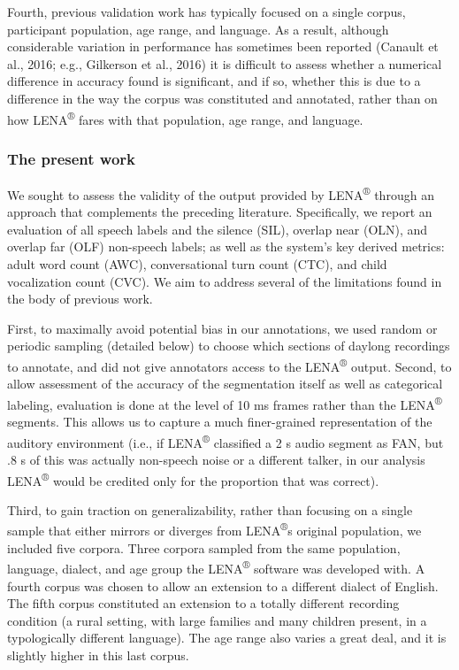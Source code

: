\documentclass[english,floatsintext,man]{apa6}
\begin{document}
Fourth, previous validation work has typically focused on a single
corpus, participant population, age range, and language. As a result,
although considerable variation in performance has sometimes been
reported (Canault et al., 2016; e.g., Gilkerson et al., 2016) it is
difficult to assess whether a numerical difference in accuracy found is
significant, and if so, whether this is due to a difference in the way
the corpus was constituted and annotated, rather than on how
LENA\textsuperscript{®} fares with that population, age range, and
language.

\subsubsection{The present work}\label{the-present-work}

We sought to assess the validity of the output provided by
LENA\textsuperscript{®} through an approach that complements the
preceding literature. Specifically, we report an evaluation of all
speech labels and the silence (SIL), overlap near (OLN), and overlap far
(OLF) non-speech labels; as well as the system's key derived metrics:
adult word count (AWC), conversational turn count (CTC), and child
vocalization count (CVC). We aim to address several of the limitations
found in the body of previous work.

First, to maximally avoid potential bias in our annotations, we used
random or periodic sampling (detailed below) to choose which sections of
daylong recordings to annotate, and did not give annotators access to
the LENA\textsuperscript{®} output. Second, to allow assessment of the
accuracy of the segmentation itself as well as categorical labeling,
evaluation is done at the level of 10 ms frames rather than the
LENA\textsuperscript{®} segments. This allows us to capture a much
finer-grained representation of the auditory environment (i.e., if
LENA\textsuperscript{®} classified a 2 s audio segment as FAN, but .8 s
of this was actually non-speech noise or a different talker, in our
analysis LENA\textsuperscript{®} would be credited only for the
proportion that was correct).

Third, to gain traction on generalizability, rather than focusing on a
single sample that either mirrors or diverges from
LENA\textsuperscript{®}s original population, we included five corpora.
Three corpora sampled from the same population, language, dialect, and
age group the LENA\textsuperscript{®} software was developed with. A
fourth corpus was chosen to allow an extension to a different dialect of
English. The fifth corpus constituted an extension to a totally
different recording condition (a rural setting, with large families and
many children present, in a typologically different language). The age
range also varies a great deal, and it is slightly higher in this last
corpus.
\end{document}
